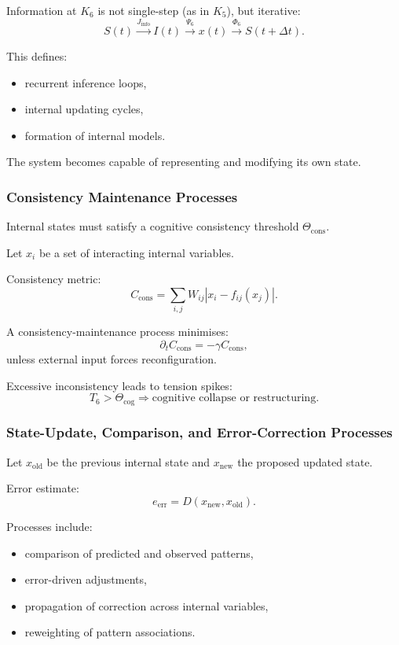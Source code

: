 Information at $K_6$ is not single-step (as in $K_5$), but iterative:
\[
S(t) \xrightarrow{J_{\text{info}}}
I(t) \xrightarrow{\Psi_6}
x(t) \xrightarrow{\Phi_6}
S(t+\Delta t).
\]

This defines:
\begin{itemize}
    \item recurrent inference loops,
    \item internal updating cycles,
    \item formation of internal models.
\end{itemize}

The system becomes capable of representing and modifying its own state.

\subsubsection{Consistency Maintenance Processes}

Internal states must satisfy a cognitive consistency threshold $\Theta_{\text{cons}}$.

Let $x_i$ be a set of interacting internal variables.

Consistency metric:
\[
C_{\text{cons}} = \sum_{i,j} W_{ij} |x_i - f_{ij}(x_j)|.
\]

A consistency-maintenance process minimises:
\[
\partial_t C_{\text{cons}} = -\gamma C_{\text{cons}},
\]
unless external input forces reconfiguration.

Excessive inconsistency leads to tension spikes:
\[
T_6 > \Theta_{\text{cog}}
\Rightarrow \text{cognitive collapse or restructuring}.
\]

\subsubsection{State-Update, Comparison, and Error-Correction Processes}

Let $x_{\text{old}}$ be the previous internal state and
$x_{\text{new}}$ the proposed updated state.

Error estimate:
\[
e_{\mathrm{err}} = D(x_{\text{new}}, x_{\text{old}}).
\]

Processes include:
\begin{itemize}
    \item comparison of predicted and observed patterns,
    \item error-driven adjustments,
    \item propagation of correction across internal variables,
    \item reweighting of pattern associations.
\end{itemize}

